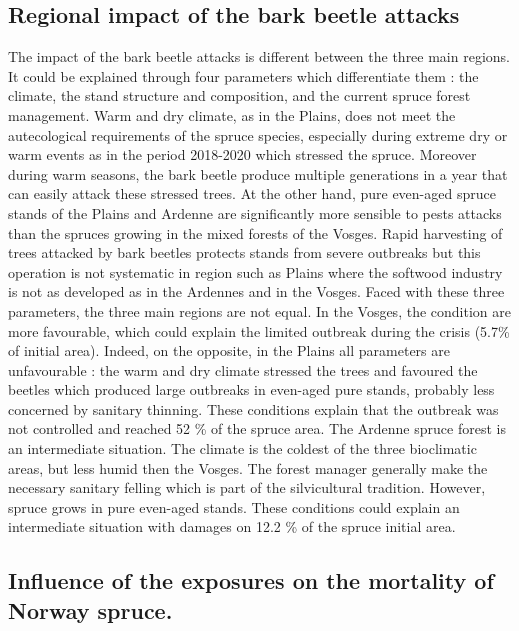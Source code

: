 \documentclass[3p,procedia]{elsarticle}
\begin{document}
\subsection{Regional impact of the bark beetle attacks}
The  impact of the bark beetle attacks is different between the three main regions.
It could be explained through four parameters which differentiate them : the climate, the stand structure and composition, and the current spruce forest management.
Warm and dry climate, as in the Plains, does not meet the autecological requirements of the spruce species, especially during extreme dry or warm events as in the period 2018-2020 \citep{rousi_accelerated_2022} which stressed the spruce. Moreover during warm seasons, the bark beetle produce multiple generations in a year \citep{annila_influence_1969,baier_phenipscomprehensive_2007} that can easily attack these stressed trees.
At the other hand, pure even-aged spruce stands of the Plains and Ardenne are significantly more sensible to pests attacks \citep{faccoli_composition_2014,jactel_2021} than the spruces growing in the mixed forests of the Vosges.
Rapid harvesting of trees attacked by bark beetles protects stands from severe outbreaks \citep{stadelmann_effects_2013} but this operation is not systematic in region such as Plains where the softwood industry is not as developed as in the Ardennes and in the Vosges.
Faced with these three parameters, the three main regions are not equal.
In the Vosges, the condition are more favourable, which could explain the limited outbreak during the crisis (5.7\% of initial area).
Indeed, on the opposite, in the Plains all parameters are unfavourable : the warm and dry climate stressed the trees and favoured the beetles which produced large outbreaks in even-aged pure stands, probably less concerned by sanitary thinning. 
These conditions explain that the outbreak was not controlled and reached 52 \% of the spruce area.
The Ardenne spruce forest is an intermediate situation.
The climate is the coldest of the three bioclimatic areas, but less humid then the Vosges.
The forest manager generally make the necessary sanitary felling which is part of the silvicultural tradition.
However, spruce grows in pure even-aged stands.
These conditions could explain an intermediate situation with damages on 12.2 \% of the spruce initial area.


\subsection{Influence of the exposures on the mortality of Norway spruce.}
\end{document}
